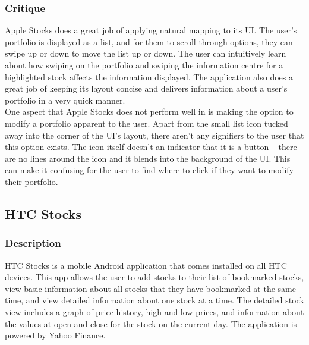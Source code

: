 \documentclass{sigchi}
\begin{document}
\subsubsection{Critique}
Apple Stocks does a great job of applying natural mapping to its UI. The user's portfolio is displayed as a list, and for them to scroll through options, they can swipe up or down to move the list up or down. The user can intuitively learn about how swiping on the portfolio and swiping the information centre for a highlighted stock affects the information displayed. The application also does a great job of keeping its layout concise and delivers information about a user's portfolio in a very quick manner. \\
One aspect that Apple Stocks does not perform well in is making the option to modify a portfolio apparent to the user. Apart from the small list icon tucked away into the corner of the UI's layout, there aren't any signifiers to the user that this option exists. The icon itself doesn't an indicator that it is a button – there are no lines around the icon and it blends into the background of the UI. This can make it confusing for the user to find where to click if they want to modify their portfolio.



\subsection{HTC Stocks}
\subsubsection{Description}
HTC Stocks is a mobile Android application that comes installed on all HTC devices.  This app allows the user to add stocks to their list of bookmarked stocks, view basic information about all stocks that they have bookmarked at the same time, and view detailed information about one stock at a time.  The detailed stock view includes a graph of price history, high and low prices, and information about the values at open and close for the stock on the current day.  The application is powered by Yahoo Finance.

\end{document}
